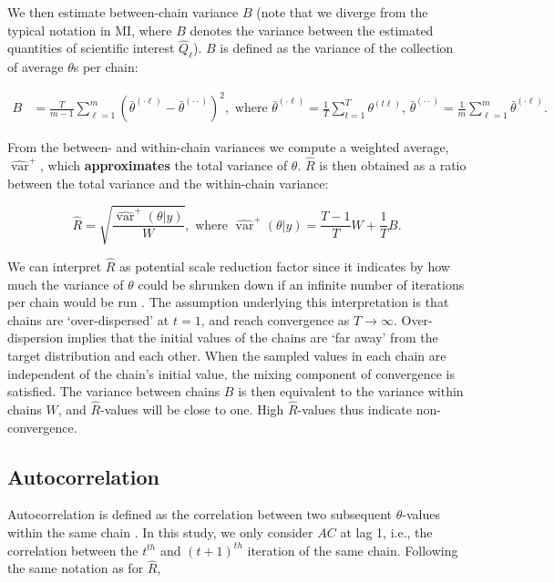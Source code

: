 \documentclass[Royal,times,sageh]{sagej}
\begin{document}
\noindent We then estimate between-chain variance \(B\) (note that we diverge from the typical notation in MI, where \(B\) denotes the variance between the estimated quantities of scientific interest \(\hat{Q}_{\ell}\)). \(B\) is defined as the variance of the collection of average \(\theta\)s per chain:

\begin{align*}
B&=\frac{T}{m-1} \sum_{\ell=1}^{m}\left(\bar{\theta}^{(\cdot \ell)}-\bar{\theta}^{(\cdot \cdot)}\right)^{2}, \text { where } \bar{\theta}^{(\cdot \ell)}=\frac{1}{T} \sum_{t=1}^{T} \theta^{(t \ell)} \text{, } \bar{\theta}^{(\cdot \cdot)}=\frac{1}{m} \sum_{\ell=1}^{m} \bar{\theta}^{(\cdot \ell)}. 
\end{align*}

\noindent From the between- and within-chain variances we compute a weighted average, \(\widehat{\operatorname{var}}^{+}\), which \textbf{approximates} the total variance of \(\theta\). \(\widehat{R}\) is then obtained as a ratio between the total variance and the within-chain variance:

\begin{equation*}
\widehat{R}=\sqrt{\frac{\widehat{\operatorname{var}}^{+}(\theta | y)}{W}},
\text{ where } \widehat{\operatorname{var}}^{+}(\theta | y)=\frac{T-1}{T} W+\frac{1}{T} B.
\end{equation*}

We can interpret \(\widehat{R}\) as potential scale reduction factor since it indicates by how much the variance of \(\theta\) could be shrunken down if an infinite number of iterations per chain would be run \citep{gelm92}. The assumption underlying this interpretation is that chains are `over-dispersed' at \(t=1\), and reach convergence as \(T \to \infty\). Over-dispersion implies that the initial values of the chains are `far away' from the target distribution and each other. When the sampled values in each chain are independent of the chain's initial value, the mixing component of convergence is satisfied. The variance between chains \(B\) is then equivalent to the variance within chains \(W\), and \(\widehat{R}\)-values will be close to one. High \(\widehat{R}\)-values thus indicate non-convergence.

\hypertarget{autocorrelation}{%
\subsection{Autocorrelation}\label{autocorrelation}}

Autocorrelation is defined as the correlation between two subsequent \(\theta\)-values within the same chain \citep[p.~147]{lync07}. In this study, we only consider \(AC\) at lag 1, i.e., the correlation between the \(t^{th}\) and \((t+1)^{th}\) iteration of the same chain. Following the same notation as for \(\widehat{R}\),
\end{document}

